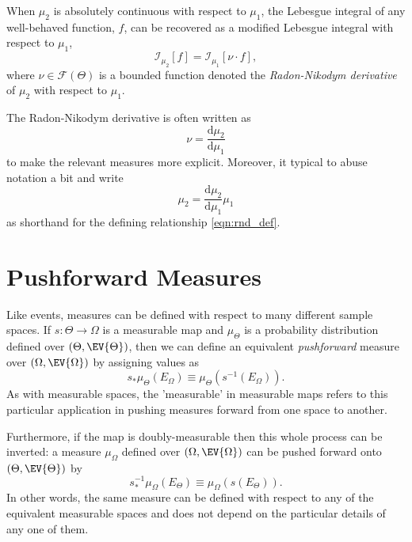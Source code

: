 When $\mu_{2}$ is absolutely continuous with respect to
$\mu_{1}$, the Lebesgue integral of any well-behaved
function, $f$, can be recovered as a modified Lebesgue 
integral with respect to $\mu_{1}$,
%
\begin{equation} \label{eqn:rnd_def}
\mathcal{I}_{\mu_{2}} \! \left[ f \right]
=
\mathcal{I}_{\mu_{1}} \! \left[ \nu \cdot f \right],
\end{equation}
%
where $\nu \in \mathcal{F} \! \left( \Theta \right)$ is a bounded 
function denoted the \emph{Radon-Nikodym derivative} of 
$\mu_{2}$ with respect to $\mu_{1}$.  

The Radon-Nikodym derivative is often written as
%
\begin{equation*}
\nu = \frac{ \mathrm{d} \mu_{2} }{ \mathrm{d} \mu_{1} }
\end{equation*}
%
to make the relevant measures more explicit.  Moreover, it typical to
abuse notation a bit and write
%
\begin{equation*}
\mu_{2} = 
\frac{ \mathrm{d} \mu_{2} }{ \mathrm{d} \mu_{1} } 
\mu_{1}
\end{equation*}
%
as shorthand for the defining relationship \eqref{eqn:rnd_def}.

\section{Pushforward Measures}

Like events, measures can be defined with respect to many 
different sample spaces.  If $s : \Theta \rightarrow \Omega$ 
is a measurable map and $\mu_{\Theta}$ is a probability 
distribution defined over $\left( \Theta, \EV{\Theta} \right)$, 
then we can define an equivalent \emph{pushforward} measure 
over $\left( \Omega, \EV{\Omega} \right)$ by assigning values as
%
\begin{equation*}
s_{*} \mu_{\Theta} \! \left( E_{\Omega} \right)
\equiv
\mu_{\Theta} \! \left( s^{-1} \! \left( E_{\Omega} \right) \right).
\end{equation*}
%
As with measurable spaces, the 'measurable' in measurable 
maps refers to this particular application in pushing measures 
forward from one space to another.

Furthermore, if the map is doubly-measurable then this whole 
process can be inverted: a measure $\mu_{\Omega}$ defined 
over $\left( \Omega, \EV{\Omega} \right)$ can be pushed
forward onto $\left( \Theta, \EV{\Theta} \right)$ by
%
\begin{equation*}
s^{-1}_{*} \mu_{\Omega} \! \left( E_{\Theta} \right)
\equiv
\mu_{\Omega} \! \left( s \! \left( E_{\Theta} \right) \right).
\end{equation*}
%
In other words, the same measure can be defined with respect
to any of the equivalent measurable spaces and does not 
depend on the particular details of any one of them.

